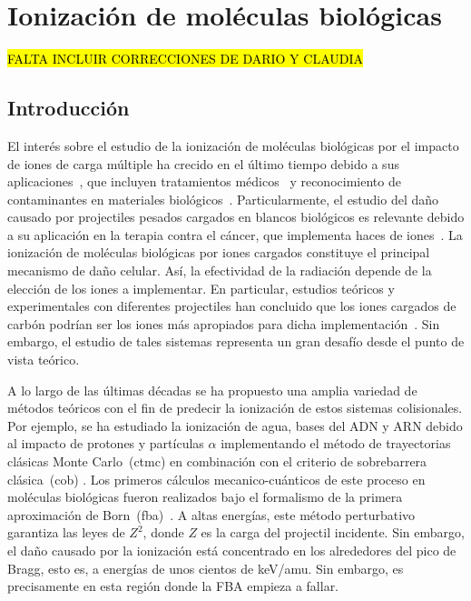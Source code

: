 \chapter{Ionización de moléculas biológicas}
\label{chap:ionmol}

\begin{center}
\colorbox{yellow}{\textcolor{black}{FALTA INCLUIR CORRECCIONES DE DARIO Y CLAUDIA}}
\end{center}

\section{Introducción}

El interés sobre el estudio de la ionización de moléculas biológicas por 
el impacto de iones de carga múltiple ha crecido en el último tiempo 
debido a sus aplicaciones~\cite{Liamsuwan:13}, que incluyen tratamientos 
médicos~\cite{Mohamad:17,Baskar:12,Denifl:11,Solov:09} y reconocimiento 
de contaminantes en materiales biológicos~\cite{Gafur:18,FerrazDias:13}. 
Particularmente, el estudio del daño causado por projectiles pesados 
cargados en blancos biológicos es relevante debido a su aplicación en la 
terapia contra el cáncer, que implementa haces de iones~\cite{Baskar:12}. 
La ionización de moléculas biológicas por iones cargados constituye el 
principal mecanismo de daño celular. Así, la efectividad de la radiación 
depende de la elección de los iones a implementar. En particular, 
estudios teóricos y experimentales con diferentes projectiles han 
concluido que los iones cargados de carbón podrían ser los iones más 
apropiados para dicha implementación~\cite{Mohamad:17}. Sin embargo, el 
estudio de tales sistemas representa un gran desafío desde el punto de 
vista teórico. 

A lo largo de las últimas décadas se ha propuesto una amplia variedad de 
métodos teóricos con el fin de predecir la ionización de estos sistemas 
colisionales. Por ejemplo, se ha estudiado la ionización de agua, bases 
del ADN y ARN debido al impacto de protones y partículas $\alpha$ 
implementando el método de trayectorias clásicas Monte Carlo~(\acs{ctmc}) 
en combinación con el criterio de sobrebarrera clásica~(\acs{cob}) 
\cite{Abbas:08,Lekadir:09}. Los primeros cálculos mecanico-cuánticos de 
este proceso en moléculas biológicas fueron realizados bajo el formalismo 
de la primera aproximación de Born~(\acs{fba})~\cite{DalCappello:08,
Champion:10}. A altas energías, este método perturbativo garantiza las 
leyes de $Z^2$, donde $Z$ es la carga del projectil incidente. Sin 
embargo, el daño causado por la ionización está concentrado en los 
alrededores del pico de Bragg, esto es, a energías de unos cientos de 
keV/amu. Sin embargo, es precisamente en esta región donde la FBA empieza 
a fallar. 

